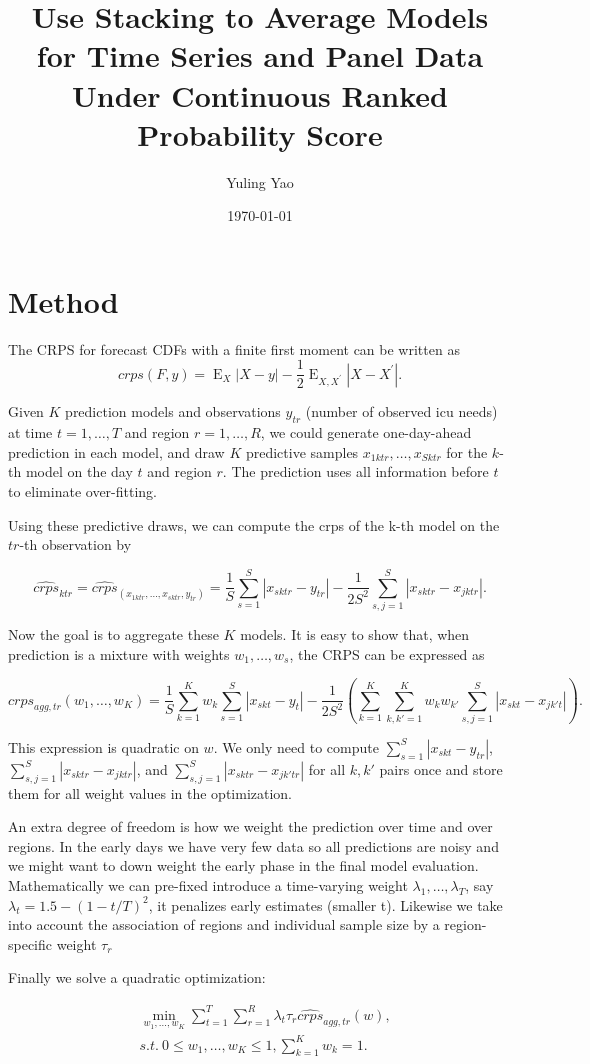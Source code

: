 \documentclass[11pt]{article}
\title{\bf  Use Stacking to Average Models for Time Series and Panel Data Under Continuous Ranked Probability Score }
\author{Yuling Yao}
\date{\today \vspace{-.1in}}
\DeclareMathOperator{\E}{\mathrm{E}}
\begin{document}
\sloppy
	\maketitle
	\thispagestyle{empty}

\section{Method}
The CRPS  for forecast CDFs with a finite first
moment can be written as
$$crps(F,y)=\E_X|X-y|- \frac{1}{2}\E_{X,X^\prime}|X-X^\prime|.$$

Given $K$ prediction models and observations $y_{tr}$ (number of observed icu needs) at time $t=1, \dots, T$ and region $r=1,\dots, R$, we could generate one-day-ahead prediction in each model, and draw $K$ predictive samples $x_{1ktr}, \dots, x_{Sktr}$ for the $k$-th model on the  day $t$ and region $r$. The prediction uses all information before $t$ to eliminate over-fitting.

Using these predictive draws, we can compute the crps of the k-th model on the $tr$-th observation by 

$$ \widehat {crps}_{ktr}= \widehat {crps}_(x_{1ktr}, \dots, x_{sktr},y_{tr})= \frac{1}{S} \sum_{s=1}^S  |x_{sktr}-y_{tr}| -
\frac{1}{2S^2} \sum_{s, j=1}^S |x_{sktr}- x_{jktr}|.$$

Now the goal is to aggregate these $K$ models. It is easy to show that, when prediction is a mixture with weights $w_1, \dots, w_s$, the CRPS can be expressed as

$$ \widehat {crps}_{agg, tr} (w_1, \dots, w_K) = \frac{1}{S} \sum_{k=1}^K w_k  \sum_{s=1}^S |x_{skt}-y_t| -
\frac{1}{2S^2}  (\sum_{k=1}^K   \sum_{k, k'=1 }^K w_k w_{k'}   \sum_{s, j=1}^S |x_{skt}- x_{jk't}| ).$$

This expression is quadratic on $w$. We only need to compute  $\sum_{s=1}^S |x_{skt}-y_{tr}|$, $\sum_{s, j=1}^S |x_{sktr}- x_{jktr}|$, and 
$\sum_{s, j=1}^S |x_{sktr}- x_{jk'tr}|$ for all $k, k'$ pairs once and store them for all  weight values in the optimization. 

An extra degree of freedom is how we weight the prediction over time and over regions. In the early days we have very few data so all predictions are noisy and we might want to down weight the early phase in the final model evaluation. Mathematically we can pre-fixed introduce a time-varying weight $\lambda_1, \dots, \lambda_T$, say $\lambda_t = 1.5-(1-t/T)^2$, it penalizes early estimates (smaller t).  Likewise  we take into account the association of regions and individual sample size by a region-specific weight $\tau_r$

Finally we solve a quadratic optimization:

\begin{align*}
 &\min_{w_1, \dots, w_K} \sum_{t=1}^T  \sum_{r=1}^R\lambda_t\tau_r  \widehat {crps}_{agg, tr} (w), \\
  &s.t. ~{0\leq w_1, \dots, w_K \leq 1, \sum_{k=1}^K w_k=1}. 
\end{align*}
 
\end{document}
